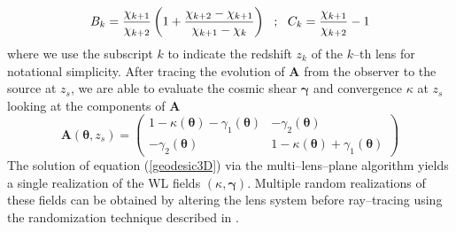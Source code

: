 \documentclass[5p]{elsarticle}
\newcommand{\bb}[1]{\mathbf{#1}}
\begin{document}
\begin{equation}
B_k = \frac{\chi_{k+1}}{\chi_{k+2}}\left(1 + \frac{\chi_{k+2}-\chi_{k+1}}{\chi_{k+1}-\chi_k}\right) \,\,\,\, ; \,\,\,\, C_k = \frac{\chi_{k+1}}{\chi_{k+2}} - 1 \\ \\
\end{equation} 
%
where we use the subscript $k$ to indicate the redshift $z_k$ of the $k$--th lens for notational simplicity. After tracing the evolution of $\bb{A}$ from the observer to the source at $z_s$, we are able to evaluate the cosmic shear $\pmb{\gamma}$ and convergence $\kappa$ at $z_s$ looking at the components of $\bb{A}$
\begin{equation}
\label{convsheardef}
\bb{A}(\pmb{\theta},z_s) = 
\begin{pmatrix}
1-\kappa(\pmb{\theta}) - \gamma_1(\pmb{\theta}) & -\gamma_2(\pmb{\theta}) \\
-\gamma_2(\pmb{\theta}) & 1-\kappa(\pmb{\theta}) + \gamma_1(\pmb{\theta})
\end{pmatrix}
\end{equation}
%
The solution of equation (\ref{geodesic3D}) via the multi--lens--plane algorithm yields a single realization of the WL fields $(\kappa,\pmb{\gamma})$. Multiple random realizations of these fields can be obtained by altering the lens system before ray--tracing using the randomization technique described in \citep{Petri16}.
\end{document}
